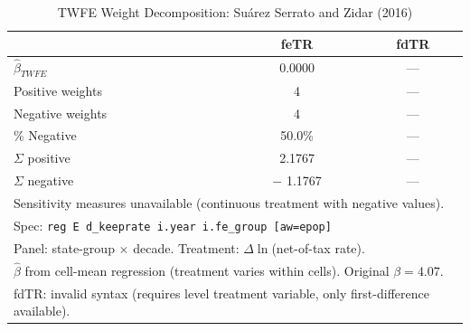 \begin{table}[htbp]
\centering
\caption{TWFE Weight Decomposition: Su\'{a}rez Serrato and Zidar (2016)}
\label{tab:ssz_weights}
\begin{tabular}{lcc}
\hline\hline
 & feTR & fdTR \\
\hline
$\hat{\beta}_{TWFE}$ &    0.0000 & --- \\
Positive weights & 4 & --- \\
Negative weights & 4 & --- \\
\% Negative &  50.0\% & --- \\
$\Sigma$ positive &    2.1767 & --- \\
$\Sigma$ negative & $-$   1.1767 & --- \\
\hline
\multicolumn{3}{l}{\footnotesize Sensitivity measures unavailable (continuous treatment with negative values).} \\
\hline
\multicolumn{3}{l}{\footnotesize Spec: \texttt{reg E d\_keeprate i.year i.fe\_group [aw=epop]}} \\
\multicolumn{3}{l}{\footnotesize Panel: state-group $\times$ decade. Treatment: $\Delta\ln$(net-of-tax rate).} \\
\multicolumn{3}{l}{\footnotesize $\hat\beta$ from cell-mean regression (treatment varies within cells). Original $\beta=4.07$.} \\
\multicolumn{3}{l}{\footnotesize fdTR: invalid syntax (requires level treatment variable, only first-difference available).} \\
\hline\hline
\end{tabular}
\end{table}
